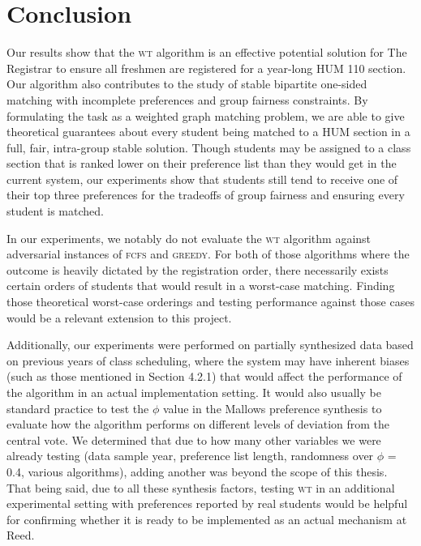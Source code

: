 
\chapter*{Conclusion}

Our results show that the \textsc{wt} algorithm is an effective potential solution
for The Registrar to ensure all freshmen are registered for a year-long HUM 110
section. Our algorithm also contributes to the study of stable bipartite
one-sided matching with incomplete preferences and group fairness constraints.
By formulating the task as a weighted graph matching problem, we are able to
give theoretical guarantees about every student being matched to a HUM section
in a full, fair, intra-group stable solution. Though students may be assigned to
a class section that is ranked lower on their preference list than they would
get in the current system, our experiments show that students still tend to receive one
of their top three preferences for the tradeoffs of group fairness and ensuring
every student is matched.

In our experiments, we notably do not evaluate the \textsc{wt} algorithm against
adversarial instances of \textsc{fcfs} and \textsc{greedy}. For both of those algorithms where the
outcome is heavily dictated by the registration order, there necessarily exists
certain orders of students that would result in a worst-case matching. Finding
those theoretical worst-case orderings and testing performance against those
cases would be a relevant extension to this project.

Additionally, our experiments were performed on partially synthesized data based
on previous years of class scheduling, where the system may have inherent biases
(such as those mentioned in Section 4.2.1)
that would affect the performance of the algorithm in an actual implementation
setting. It would also usually be standard practice to test the $\phi$ value in the
Mallows preference synthesis to evaluate how the algorithm performs on different
levels of deviation from the central vote. We determined that due to how many other
variables we were already testing (data sample year, preference list length,
randomness over $\phi$ = 0.4, various algorithms), adding another was beyond the
scope of this thesis. That being said, due to all these synthesis factors,
testing \textsc{wt} in an additional experimental setting with preferences
reported by real students would be helpful for confirming whether it is ready to
be implemented as an actual mechanism at Reed.

